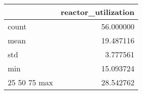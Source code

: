 \begin{tabular}{lr}
\toprule
 & reactor\_utilization \\
\midrule
count & 56.000000 \\
mean & 19.487116 \\
std & 3.777561 \\
min & 15.093724 \\
25%
50%
75%
max & 28.542762 \\
\bottomrule
\end{tabular}


